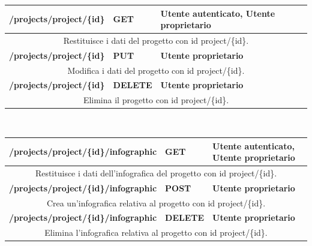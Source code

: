 \begin{table}[H]
	\begin{tabular}{|p{}|p{}|p{}|}
		\toprule
		\textbf{/projects/project/\{id\}} & \textbf{GET} & \textbf{Utente autenticato, Utente proprietario} \\ \midrule
		\multicolumn{3}{|c|}{Restituisce i dati del progetto con id project/\{id\}.} \\ \midrule
		\textbf{/projects/project/\{id\}} & \textbf{PUT} & \textbf{Utente proprietario} \\ \midrule
		\multicolumn{3}{|c|}{Modifica i dati del progetto con id project/\{id\}.} \\ \midrule
		\textbf{/projects/project/\{id\}} & \textbf{DELETE} & \textbf{Utente proprietario} \\ \midrule
		\multicolumn{3}{|c|}{Elimina il progetto con id project/\{id\}.} \\
		\bottomrule
	\end{tabular}
	\\ \par\bigskip
	
	\begin{tabular}{|p{}|p{}|p{}|}
		\toprule
		\textbf{/projects/project/\{id\}/infographic} & \textbf{GET} & \textbf{Utente autenticato, Utente proprietario} \\ \midrule
		\multicolumn{3}{|c|}{Restituisce i dati dell'infografica del progetto con id project/\{id\}.} \\
		\bottomrule
		\textbf{/projects/project/\{id\}/infographic} & \textbf{POST} & \textbf{Utente proprietario} \\ \midrule
		\multicolumn{3}{|c|}{Crea un'infografica relativa al progetto con id project/\{id\}.} \\
		\bottomrule
		\textbf{/projects/project/\{id\}/infographic} & \textbf{DELETE} & \textbf{Utente proprietario} \\ \midrule
		\multicolumn{3}{|c|}{Elimina l'infografica relativa al progetto con id project/\{id\}.} \\
		\bottomrule
	\end{tabular}\\
	\par\bigskip
	

\end{table}
